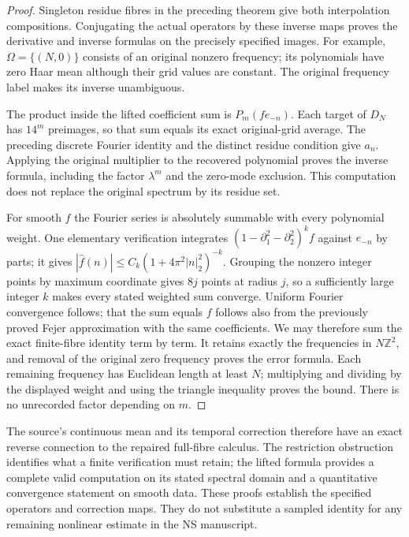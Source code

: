 \begin{proof}
Singleton residue fibres in the preceding theorem give
both interpolation compositions. Conjugating the actual
operators by these inverse maps proves the derivative
and inverse formulas on the precisely specified images.
For example, $\Omega=\{(N,0)\}$ consists of an original
nonzero frequency; its polynomials have zero Haar mean
although their grid values are constant. The original
frequency label makes its inverse unambiguous.

The product inside the lifted coefficient sum is
$P_m(fe_{-n})$. Each target of $D_N$ has $14^m$
preimages, so that sum equals its exact original-grid
average. The preceding discrete Fourier identity and
the distinct residue condition give $a_n$. Applying
the original multiplier to the recovered polynomial
proves the inverse formula, including the factor
$\lambda^m$ and the zero-mode exclusion. This computation
does not replace the original spectrum by its residue set.

For smooth $f$ the Fourier series is absolutely summable
with every polynomial weight. One elementary verification
integrates $(1-\partial_1^2-\partial_2^2)^kf$ against
$e_{-n}$ by parts; it gives
$|\widehat f(n)|\le C_k(1+4\pi^2|n|_2^2)^{-k}$.
Grouping the nonzero integer points by maximum coordinate
gives $8j$ points at radius $j$, so a sufficiently large
integer $k$ makes every stated weighted sum converge.
Uniform Fourier convergence follows; that the sum equals
$f$ follows also from the previously proved Fejer
approximation with the same coefficients.
We may therefore sum the exact finite-fibre identity
term by term. It retains exactly the frequencies in
$N\mathbb Z^2$, and removal of the original zero
frequency proves the error formula. Each remaining
frequency has Euclidean length at least $N$; multiplying
and dividing by the displayed weight and using the
triangle inequality proves the bound. There is no
unrecorded factor depending on $m$.
\end{proof}

The source's continuous mean and its temporal correction
therefore have an exact reverse connection to the repaired
full-fibre calculus. The restriction obstruction identifies
what a finite verification must retain; the lifted formula
provides a complete valid computation on its stated spectral
domain and a quantitative convergence statement on smooth
data. These proofs establish the specified operators and
correction maps. They do not substitute a sampled identity
for any remaining nonlinear estimate in the NS manuscript.
